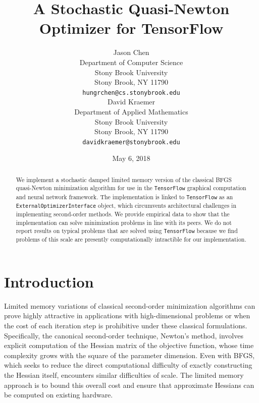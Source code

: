 \documentclass{article}
\title{A Stochastic Quasi-Newton Optimizer for TensorFlow}
\author{
  Jason Chen \\
  Department of Computer Science \\
  Stony Brook University \\
  Stony Brook, NY 11790 \\
  \texttt{hungrchen@cs.stonybrook.edu} \\
  \And
  David Kraemer \\
  Department of Applied Mathematics\\
  Stony Brook University \\
  Stony Brook, NY 11790 \\
  \texttt{davidkraemer@stonybrook.edu}
}
\date{May 6, 2018}
\begin{document}
\maketitle


\begin{abstract}
  We implement a stochastic damped limited memory version of the classical BFGS
  quasi-Newton minimization algorithm for use in the \texttt{TensorFlow}
  graphical computation and neural network framework. The implementation is
  linked to \texttt{TensorFlow} as an \texttt{ExternalOptimizerInterface}
  object, which circumvents architectural challenges in implementing
  second-order methods. We provide empirical data to show that the
  implementation can solve minimization problems in line with its peers. We do
  not report results on typical problems that are solved using
  \texttt{TensorFlow} because we find problems of this scale are presently
  computationally intractible for our implementation.
\end{abstract}



\section{Introduction}




Limited memory variations of classical second-order minimization algorithms can
prove highly attractive in applications with high-dimensional problems or when
the cost of each iteration step is prohibitive under these classical
formulations.  Specifically, the canonical second-order technique, Newton's
method, involves explicit computation of the Hessian matrix of the objective
function, whose time complexity grows with the square of the parameter
dimension. Even with BFGS, which seeks to reduce the direct computational
difficulty of exactly constructing the Hessian itself, encounters similar
difficulties of scale. The limited memory approach is to bound this overall cost
and ensure that approximate Hessians can be computed on existing hardware.
\end{document}
